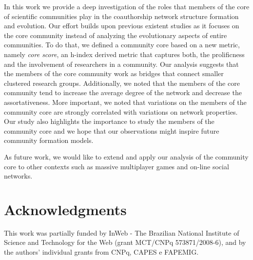 \documentclass[letterpaper]{www13-companion-accepted}
\begin{document}
In this work we provide a deep investigation of the roles that members of the core of scientific communities play in the coauthorship network structure formation and evolution.
Our effort builds upon previous existent studies as it focuses on the core community instead of analyzing the evolutionary aspects of entire communities.  To do that, we defined a
community core based on a new metric, namely \textit{core score}, an h-index derived metric that captures both, the prolificness and the involvement of researchers in a community. Our analysis
suggests that the members of the core community work as bridges that connect smaller clustered research groups. Additionally, we noted that the members of the core community tend to
increase the average degree of the network and decrease the assortativeness. More important, we noted that variations on the members of the community core are strongly correlated
with variations on network properties.  Our study also highlights the importance to study the members of the community core and we hope that our observations might inspire future
community formation models.

As future work, we would like to extend and apply our analysis of the community core to other contexts such as massive multiplayer games and on-line social networks.


\section{Acknowledgments}

This work was partially funded by InWeb - The Brazilian National Institute
of Science and Technology for the Web (grant MCT/CNPq 573871/2008-6), and
by the authors' individual grants from CNPq, CAPES e FAPEMIG.
\end{document}
